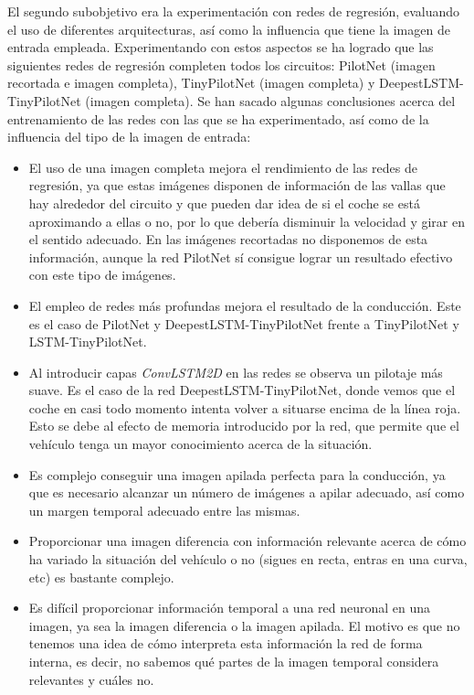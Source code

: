 El segundo subobjetivo era la experimentación con redes de regresión, evaluando el uso de diferentes arquitecturas, así como la influencia que tiene la imagen de entrada empleada. Experimentando con estos aspectos se ha logrado que las siguientes redes de regresión completen todos los circuitos: PilotNet (imagen recortada e imagen completa), TinyPilotNet (imagen completa) y DeepestLSTM-TinyPilotNet (imagen completa). Se han sacado algunas conclusiones acerca del entrenamiento de las redes con las que se ha experimentado, así como de la influencia del tipo de la imagen de entrada:\\

\begin{itemize}
    \item El uso de una imagen completa mejora el rendimiento de las redes de regresión, ya que estas imágenes disponen de información de las vallas que hay alrededor del circuito y que pueden dar idea de si el coche se está aproximando a ellas o no, por lo que debería disminuir la velocidad y girar en el sentido adecuado. En las imágenes recortadas no disponemos de esta información, aunque la red PilotNet sí consigue lograr un resultado efectivo con este tipo de imágenes.
    
    \item El empleo de redes más profundas mejora el resultado de la conducción. Este es el caso de PilotNet y DeepestLSTM-TinyPilotNet frente a TinyPilotNet y LSTM-TinyPilotNet.
    
    \item Al introducir capas \textit{ConvLSTM2D} en las redes se observa un pilotaje más suave. Es el caso de la red DeepestLSTM-TinyPilotNet, donde vemos que el coche en casi todo momento intenta volver a situarse encima de la línea roja. Esto se debe al efecto de memoria introducido por la red, que permite que el vehículo tenga un mayor conocimiento acerca de la situación.
    
    \item Es complejo conseguir una imagen apilada perfecta para la conducción, ya que es necesario alcanzar un número de imágenes a apilar adecuado, así como un margen temporal adecuado entre las mismas.
    
    \item Proporcionar una imagen diferencia con información relevante acerca de cómo ha variado la situación del vehículo o no (sigues en recta, entras en una curva, etc) es bastante complejo.
    
    \item Es difícil proporcionar información temporal a una red neuronal en una imagen, ya sea la imagen diferencia o la imagen apilada. El motivo es que no tenemos una idea de cómo interpreta esta información la red de forma interna, es decir, no sabemos qué partes de la imagen temporal considera relevantes y cuáles no. 
\end{itemize}


